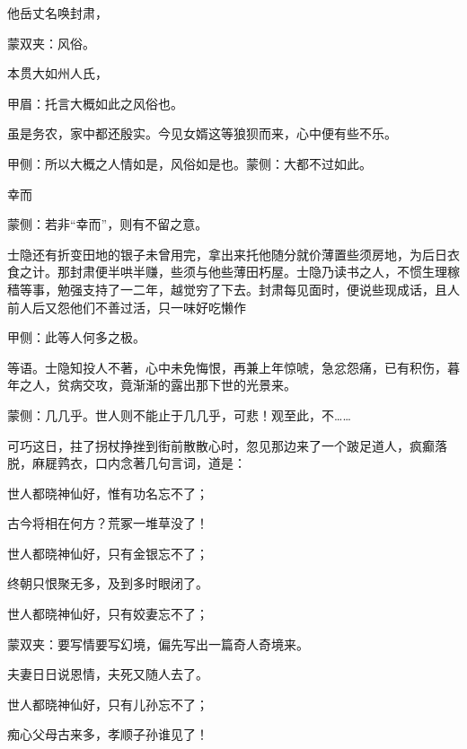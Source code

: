 \begin{parag}
    他岳丈名唤封肃，\begin{note}蒙双夹：风俗。\end{note}本贯大如州人氏，\begin{note}甲眉：托言大概如此之风俗也。\end{note}虽是务农，家中都还殷实。今见女婿这等狼狈而来，心中便有些不乐。\begin{note}甲侧：所以大概之人情如是，风俗如是也。蒙侧：大都不过如此。\end{note}幸而\begin{note}蒙侧：若非“幸而”，则有不留之意。\end{note}士隐还有折变田地的银子未曾用完，拿出来托他随分就价薄置些须房地，为后日衣食之计。那封肃便半哄半赚，些须与他些薄田朽屋。士隐乃读书之人，不惯生理稼穑等事，勉强支持了一二年，越觉穷了下去。封肃每见面时，便说些现成话，且人前人后又怨他们不善过活，只一味好吃懒作\begin{note}甲侧：此等人何多之极。\end{note}等语。士隐知投人不著，心中未免悔恨，再兼上年惊唬，急忿怨痛，已有积伤，暮年之人，贫病交攻，竟渐渐的露出那下世的光景来。\begin{note}蒙侧：几几乎。世人则不能止于几几乎，可悲！观至此，不……\end{note}
\end{parag}


\begin{parag}
    可巧这日，拄了拐杖挣挫到街前散散心时，忽见那边来了一个跛足道人，疯癫落脱，麻屣鹑衣，口内念著几句言词，道是：
\end{parag}


\begin{poem}
    \begin{pl}世人都晓神仙好，惟有功名忘不了；\end{pl}

    \begin{pl}古今将相在何方？荒冢一堆草没了！\end{pl}

    \begin{pl}世人都晓神仙好，只有金银忘不了；\end{pl}

    \begin{pl}终朝只恨聚无多，及到多时眼闭了。\end{pl}

    \begin{pl}世人都晓神仙好，只有姣妻忘不了；\end{pl}
    \begin{note}蒙双夹：要写情要写幻境，偏先写出一篇奇人奇境来。\end{note}

    \begin{pl}夫妻日日说恩情，夫死又随人去了。\end{pl}

    \begin{pl}世人都晓神仙好，只有儿孙忘不了；\end{pl}

    \begin{pl}痴心父母古来多，孝顺子孙谁见了！\end{pl}
\end{poem}


